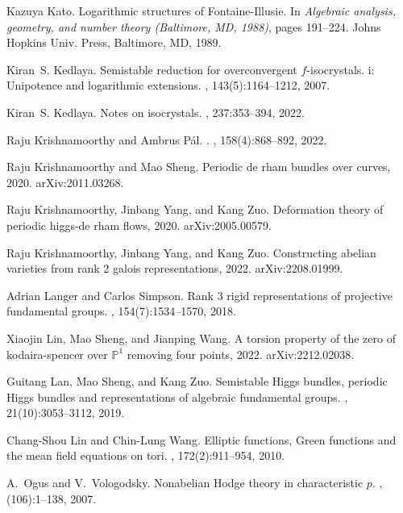\documentclass[12pt,twoside]{book}
\theoremstyle{plain}
\theoremstyle{definition}
\theoremstyle{remark}
\numberwithin{equation}{section}
\begin{document}
\begin{thebibliography}{{Ked}07}
Kazuya Kato.
\newblock Logarithmic structures of {F}ontaine-{I}llusie.
\newblock In {\em Algebraic analysis, geometry, and number theory ({B}altimore,
  {MD}, 1988)}, pages 191--224. Johns Hopkins Univ. Press, Baltimore, MD, 1989.

Kiran~S. {Kedlaya}.
\newblock Semistable reduction for overconvergent \(f\)-isocrystals. i:
  Unipotence and logarithmic extensions.
, 143(5):1164--1212, 2007.

Kiran~S. Kedlaya.
\newblock Notes on isocrystals.
, 237:353--394, 2022.

Raju Krishnamoorthy and Ambrus P{\'a}l.
.
, 158(4):868--892, 2022.

Raju Krishnamoorthy and Mao Sheng.
\newblock Periodic de rham bundles over curves, 2020.
\newblock arXiv:2011.03268.

Raju Krishnamoorthy, Jinbang Yang, and Kang Zuo.
\newblock Deformation theory of periodic higgs-de rham flows, 2020.
\newblock arXiv:2005.00579.

Raju Krishnamoorthy, Jinbang Yang, and Kang Zuo.
\newblock Constructing abelian varieties from rank 2 galois representations,
  2022.
\newblock arXiv:2208.01999.

Adrian Langer and Carlos Simpson.
\newblock Rank 3 rigid representations of projective fundamental groups.
, 154(7):1534--1570, 2018.

Xiaojin Lin, Mao Sheng, and Jianping Wang.
\newblock A torsion property of the zero of kodaira-spencer over $\mathbb{P}^1$
  removing four points, 2022.
\newblock arXiv:2212.02038.

Guitang Lan, Mao Sheng, and Kang Zuo.
\newblock Semistable {H}iggs bundles, periodic {H}iggs bundles and
  representations of algebraic fundamental groups.
, 21(10):3053--3112, 2019.

Chang-Shou Lin and Chin-Lung Wang.
\newblock Elliptic functions, {G}reen functions and the mean field equations on
  tori.
, 172(2):911--954, 2010.

A.~Ogus and V.~Vologodsky.
\newblock Nonabelian {H}odge theory in characteristic {$p$}.
, (106):1--138, 2007.


\end{thebibliography}
\end{document}
